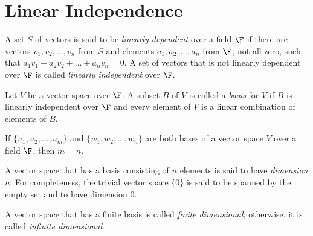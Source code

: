 \section{Linear Independence}

\begin{definition}
	A set $S$ of vectors is said to be \textit{linearly dependent} over a field $\F$ if there are vectors $v_1,v_2,\dots,v_n$ from $S$ and elements $a_1,a_2,\dots,a_n$ from $\F$, not all zero, such that $a_1v_1+a_2v_2+\dots+a_nv_n = 0$. A set of vectors that is not linearly dependent over $\F$ is called \textit{linearly independent} over $\F$.
\end{definition}

\begin{definition}[Basis]
	Let $V$ be a vector space over $\F$. A subset $B$ of $V$ is called a \textit{basis} for $V$ if $B$ is linearly independent over $\F$ and every element of $V$ is a linear combination of elements of $B$.
\end{definition}

\begin{theorem}
	If $\{u_1,u_2,\dots,u_m\}$ and $\{w_1,w_2,\dots,w_n\}$ are both bases of a vector space $V$ over a field $\F$, then $m=n$.
\end{theorem}

\begin{definition}[Dimension]
	A vector space that has a basis consisting of $n$ elements is said to have \textit{dimension $n$}. For completeness, the trivial vector space $\{0\}$ is said to be spanned by the empty set and to have dimension 0.

	\noindent A vector space that has a finite basis is called \textit{finite dimensional}; otherwise, it is called \textit{infinite dimensional}.
\end{definition}
